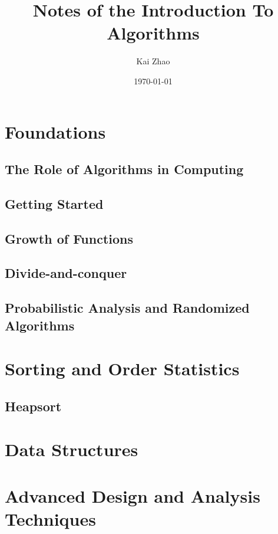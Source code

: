 \documentclass [11pt]{book}
\title {Notes of the Introduction To Algorithms}
\author {Kai Zhao}
\date {\today}
\begin{document}
\maketitle

\tableofcontents


\part {Foundations}

\chapter {The Role of Algorithms in Computing}
\chapter {Getting Started}
\chapter {Growth of Functions}
\chapter {Divide-and-conquer}
\chapter {Probabilistic Analysis and Randomized Algorithms}


\part {Sorting and Order Statistics}

\chapter {Heapsort}


\part {Data Structures}


\part {Advanced Design and Analysis Techniques}
\end{document}
